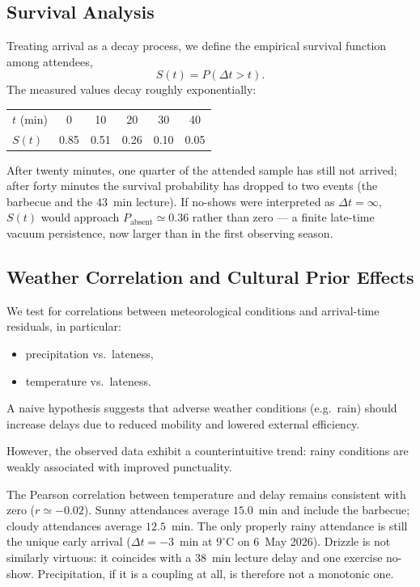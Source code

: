 \documentclass[10pt,twocolumn]{article}
\begin{document}
\subsection{Survival Analysis}

Treating arrival as a decay process, we define the empirical
survival function among attendees,
\begin{equation}
    S(t) = P(\Delta t > t).
\end{equation}
The measured values decay roughly exponentially:
\begin{center}
\small
\begin{tabular}{lccccc}
\toprule
$t$ (min) & 0 & 10 & 20 & 30 & 40 \\
$S(t)$ & 0.85 & 0.51 & 0.26 & 0.10 & 0.05 \\
\bottomrule
\end{tabular}
\end{center}
After twenty minutes, one quarter of the attended sample
has still not arrived; after forty minutes the survival
probability has dropped to two events (the barbecue and
the $43$~min lecture). If no-shows were interpreted as
$\Delta t=\infty$, $S(t)$ would approach
$P_{\mathrm{absent}}\simeq 0.36$ rather than zero --- a
finite late-time vacuum persistence, now larger than in
the first observing season.

\subsection{Weather Correlation and Cultural Prior Effects}

We test for correlations between meteorological conditions and
arrival-time residuals, in particular:
\begin{itemize}[leftmargin=0.4cm]
    \item precipitation vs.\ lateness,
    \item temperature vs.\ lateness.
\end{itemize}

A naive hypothesis suggests that adverse weather conditions
(e.g.\ rain) should increase delays due to reduced mobility and
lowered external efficiency.

However, the observed data exhibit a counterintuitive trend:
rainy conditions are weakly associated with improved punctuality.

The Pearson correlation between temperature and delay remains
consistent with zero ($r\simeq -0.02$). Sunny attendances
average $15.0$~min and include the barbecue;
cloudy attendances average $12.5$~min. The only
properly rainy attendance is still the unique early arrival
($\Delta t=-3$~min at $9^{\circ}\mathrm{C}$ on 6~May 2026).
Drizzle is not similarly virtuous: it coincides with a
$38$~min lecture delay and one exercise no-show.
Precipitation, if it is a coupling at all, is therefore not
a monotonic one.
\end{document}
